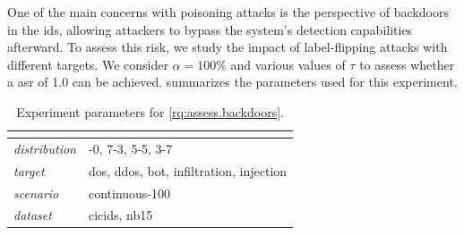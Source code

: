 One of the main concerns with poisoning attacks is the perspective of backdoors in the \gls{ids}, allowing attackers to bypass the system's detection capabilities afterward.
To assess this risk, we study the impact of label-flipping attacks with different targets.
We consider $\alpha=100\%$ and various values of $\tau$ to assess whether a \gls{asr} of 1.0 can be achieved.
 summarizes the parameters used for this experiment.

\begin{table}
  \caption{Experiment parameters for \ref{rq:assess.backdoors}.}
  \label{tbl:asssess.backdoors}
  \small
  \begin{tabular}{>{\ttfamily\itshape}p{} >{\ttfamily}p{}}
    \toprule
    \multicolumn{2}{>{\bfseries}p{.9\columnwidth}}{\rqbackdoor} \\
    \midrule
    distribution & 10-0, 7-3, 5-5, 3-7 \\
    target & dos, ddos, bot, infiltration, injection \\
    scenario & continuous-100 \\
    dataset & cicids, nb15 \\
    \bottomrule
  \end{tabular}
\end{table}

